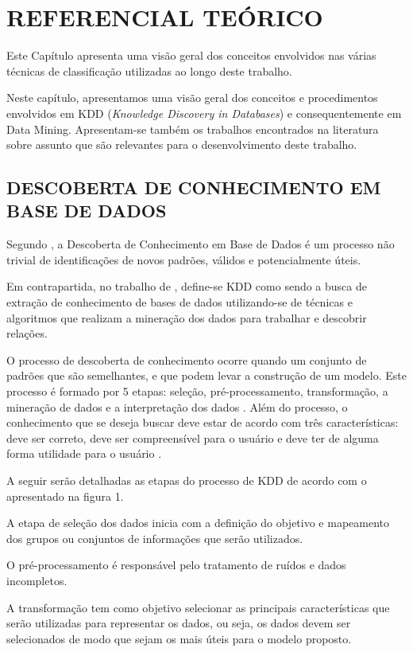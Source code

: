 \documentclass[
	12pt,				%
	openright,			%
	oneside,	
	a4paper,				%
	english,				%
	brazil				%
]{abntex2/abntex2} %
\begin{document}
\chapter{REFERENCIAL TEÓRICO}

Este Capítulo apresenta uma visão geral dos conceitos envolvidos nas várias técnicas de classificação utilizadas ao longo deste trabalho.

Neste capítulo, apresentamos uma visão geral dos conceitos e procedimentos envolvidos em KDD (\textit{Knowledge Discovery in Databases}) e consequentemente em Data Mining. Apresentam-se também os trabalhos encontrados na literatura sobre assunto que são relevantes para o desenvolvimento deste trabalho.
\vspace{-1.5\baselineskip}
	\section{DESCOBERTA DE CONHECIMENTO EM BASE DE DADOS}
	\vspace{1\baselineskip}
	Segundo \cite{fayyad:1996}, a Descoberta de Conhecimento em Base de Dados é um processo não trivial de identificações de novos padrões, válidos e potencialmente úteis.
	
	Em contrapartida, no trabalho de \cite{thome:2002}, define-se KDD como sendo a busca de extração de conhecimento de bases de dados utilizando-se de técnicas e algoritmos que realizam a mineração dos dados para trabalhar e descobrir relações.
	
	O processo de descoberta de conhecimento ocorre quando um conjunto de padrões que são semelhantes, e que podem levar a construção de um modelo. Este processo é formado por 5 etapas: seleção, pré-processamento, transformação, a mineração de dados e a interpretação dos dados \cite{fayyad:1996}. Além do processo, o conhecimento que se deseja buscar deve estar de acordo com três características: deve ser correto, deve ser compreensível para o usuário e deve ter de alguma forma utilidade para o usuário \cite{freitas:2000}.
	
	A seguir serão detalhadas as etapas do processo de KDD de acordo com o apresentado na figura 1.
	
	A etapa de seleção dos dados inicia com a definição do objetivo e mapeamento  dos grupos ou conjuntos de informações que serão utilizados.
	
	O pré-processamento é responsável pelo tratamento de ruídos e dados incompletos.
	
	A transformação tem como objetivo selecionar as principais características que serão utilizadas para representar os dados, ou seja, os dados devem ser selecionados de  modo que sejam os mais úteis para o modelo proposto.
	
\end{document}
